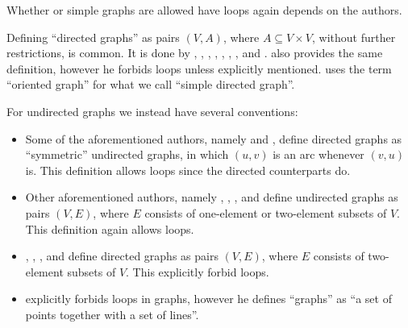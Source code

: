 \begin{remark}\label{rem:simple_graphs}
  Whether or simple graphs are allowed have loops again depends on the authors.

  Defining \enquote{directed graphs} as pairs \( (V, A) \), where \( A \subseteq V \times V \), without further restrictions, is common. It is done by , , , , , , ,  and .  also provides the same definition, however he forbids loops unless explicitly mentioned.  uses the term \enquote{oriented graph} for what we call \enquote{simple directed graph}.

  For undirected graphs we instead have several conventions:
  \begin{itemize}
    \item Some of the aforementioned authors, namely  and , define directed graphs as \enquote{symmetric} undirected graphs, in which \( (u, v) \) is an arc whenever \( (v, u) \) is. This definition allows loops since the directed counterparts do.

    \item Other aforementioned authors, namely , ,  , and  define undirected graphs as pairs \( (V, E) \), where \( E \) consists of one-element or two-element subsets of \( V \). This definition again allows loops.

    \item {}, , ,  and  define directed graphs as pairs \( (V, E) \), where \( E \) consists of two-element subsets of \( V \). This explicitly forbid loops.

    \item {} explicitly forbids loops in graphs, however he defines \enquote{graphs} as \enquote{a set of points together with a set of lines}.
  \end{itemize}


\end{remark}
